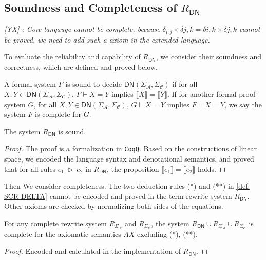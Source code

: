 \documentclass[manuscript, review, timestamp]{acmart}
\newcommand{\yx}[1]{\textit{\color{blue}[YX] : #1}}
\newcommand*{\reduce}{\ \triangleright\ }
\newcommand*{\sem}[1]{{\llbracket #1 \rrbracket}}
\begin{document}
\subsection{Soundness and Completeness of $R_\textsf{DN}$}

\yx{Core langauge cannot be complete, because $\delta_{i,j} \times \delta{j,k} = \delta{i, k} \times \delta{j, k}$ cannot be proved. we need to add such a axiom in the extended language.}

To evaluate the reliability and capability of $R_\textsf{DN}$, we consider their soundness and correctness, which are defined and proved below.

\begin{definition}
  A formal system $F$ is sound to decide $\textsf{DN}(\Sigma_\mathcal{A}, \Sigma_\mathcal{C})$ if for all $X, Y \in \textsf{DN}(\Sigma_\mathcal{A}, \Sigma_\mathcal{C})$, $F \vdash X = Y$ implies $\sem{X} = \sem{Y}$. If for another formal proof system $G$, for all $X, Y \in \textsf{DN}(\Sigma_\mathcal{A}, \Sigma_\mathcal{C})$, $G \vdash X = Y$ implies $F \vdash X = Y$, we say the system $F$ is complete for $G$.
\end{definition}

\begin{lemma}
  The system $R_\textsf{DN}$ is sound.
\end{lemma}
\begin{proof}
  The proof is a formalization in \texttt{CoqQ}. Based on the constructions of linear space, we encoded the language syntax and denotational semantics, and proved that for all rules $e_1 \reduce e_2$ in $R_\textsf{DN}$, the proposition $\sem{e_1} = \sem{e_2}$ holds.
\end{proof}

Then We consider completeness. The two deduction rules (*) and (**) in \ref{def: SCR-DELTA} cannot be encoded and proved in the term rewrite system $R_\textsf{DN}$. Other axioms are checked by normalizing both sides of the equations.

\begin{lemma}
  For any complete rewrite system $R_{\Sigma_\mathcal{A}}$ and $R_{\Sigma_\mathcal{C}}$, the system $R_\textsf{DN}\cup R_{\Sigma_\mathcal{A}} \cup R_{\Sigma_\mathcal{C}}$ is complete for the axiomatic semantics $AX$ excluding (*), (**).
\end{lemma}
\begin{proof}
  Encoded and calculated in the implementation of $R_\textsf{DN}$.
\end{proof}
\end{document}
